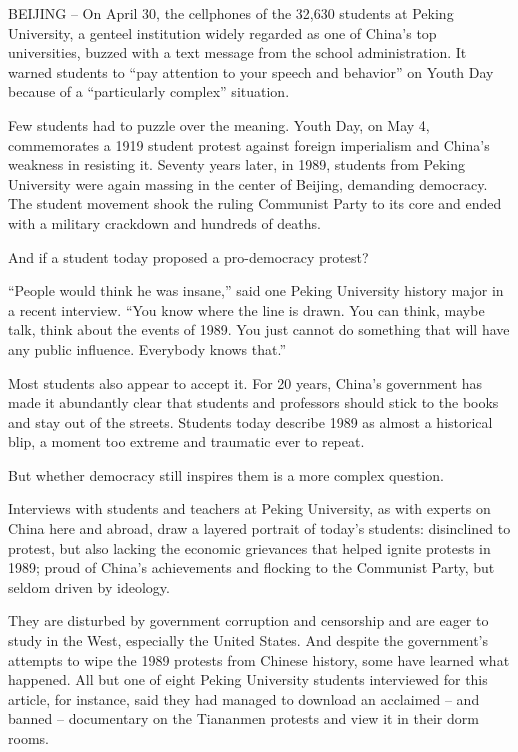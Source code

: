 \documentclass[12pt,a4paper,onecolumn]{article}
\begin{document}
BEIJING -- On April 30, the cellphones of the 32,630 students at Peking University, a genteel
institution widely regarded as one of China's top universities, buzzed with a text message from the
school administration. It warned students to ``pay attention to your speech and behavior'' on Youth
Day because of a ``particularly complex'' situation.

Few students had to puzzle over the meaning. Youth Day, on May 4, commemorates a 1919 student
protest against foreign imperialism and China's weakness in resisting it. Seventy years later, in
1989, students from Peking University were again massing in the center of Beijing, demanding
democracy. The student movement shook the ruling Communist Party to its core and ended with a
military crackdown and hundreds of deaths.

And if a student today proposed a pro-democracy protest?

``People would think he was insane,'' said one Peking University history major in a recent
interview. ``You know where the line is drawn. You can think, maybe talk, think about the events of
1989. You just cannot do something that will have any public influence. Everybody knows that.''

Most students also appear to accept it. For 20 years, China's government has made it abundantly
clear that students and professors should stick to the books and stay out of the streets. Students
today describe 1989 as almost a historical blip, a moment too extreme and traumatic ever to repeat.

But whether democracy still inspires them is a more complex question.

Interviews with students and teachers at Peking University, as with experts on China here and
abroad, draw a layered portrait of today's students: disinclined to protest, but also lacking the
economic grievances that helped ignite protests in 1989; proud of China's achievements and flocking
to the Communist Party, but seldom driven by ideology.

They are disturbed by government corruption and censorship and are eager to study in the West,
especially the United States. And despite the government's attempts to wipe the 1989 protests from
Chinese history, some have learned what happened. All but one of eight Peking University students
interviewed for this article, for instance, said they had managed to download an acclaimed -- and
banned -- documentary on the Tiananmen protests and view it in their dorm rooms.
\end{document}
